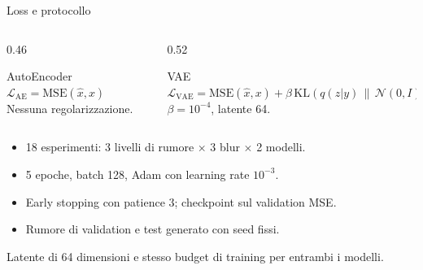 \documentclass[aspectratio=169,t]{beamer}
\newenvironment{points}{%
  \begin{itemize}\setlength{\itemsep}{0.35em}\setlength{\parskip}{0pt}%
}{\end{itemize}}
\begin{document}
\begin{frame}{Loss e protocollo}
  \begin{columns}[T,onlytextwidth]
    \begin{column}{0.46\textwidth}
      \begin{block}{AutoEncoder}
        \centering
        \small
        $\mathcal{L}_{\mathrm{AE}} = \mathrm{MSE}(\hat{x}, x)$\\[0.15em]
        {\scriptsize Nessuna regolarizzazione.}
      \end{block}
    \end{column}
    \begin{column}{0.52\textwidth}
      \begin{block}{VAE}
        \centering
        \scriptsize
        $\mathcal{L}_{\mathrm{VAE}} = \mathrm{MSE}(\hat{x},x)
        + \beta\,\mathrm{KL}\!\left(q(z|y)\,\|\,\mathcal{N}(0,I)\right)$\\[0.15em]
        {$\beta = 10^{-4}$, latente 64.}
      \end{block}
    \end{column}
  \end{columns}

  \vspace{0.15cm}
  \begin{points}
    \item 18 esperimenti: 3 livelli di rumore $\times$ 3 blur $\times$ 2 modelli.
    \item 5 epoche, batch 128, Adam con learning rate $10^{-3}$.
    \item Early stopping con patience 3; checkpoint sul validation MSE.
    \item Rumore di validation e test generato con seed fissi.
  \end{points}

  \vspace{0.35cm}
  {\small\color{muted}Latente di 64 dimensioni e stesso budget di training per entrambi i modelli.}
\end{frame}
\end{document}
